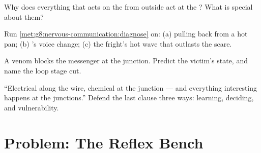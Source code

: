 \begin{exercise}[$\star\star$]\label{exo:g8:nervous-communication:9}
Why does everything that acts on the  from
outside act at the ? What is special about them?
\end{exercise}

\begin{exercise}[$\star\star$]\label{exo:g8:nervous-communication:10}
Run \cref{met:g8:nervous-communication:diagnose} on: (a)
pulling back from a hot pan; (b) 's voice change;
(c) the fright's hot wave that outlasts the scare.
\end{exercise}

\begin{exercise}[$\star\star$]\label{exo:g8:nervous-communication:11}
A venom blocks the messenger at the  junction.
Predict the victim's state, and name the loop stage cut.
\end{exercise}

\begin{exercise}[$\star\star\star$]\label{exo:g8:nervous-communication:12}
``Electrical along the wire, chemical at the junction ---
and everything interesting happens at the junctions.''
Defend the last clause three ways: learning, deciding,
and vulnerability.
\end{exercise}

\section{Problem: The Reflex Bench}

